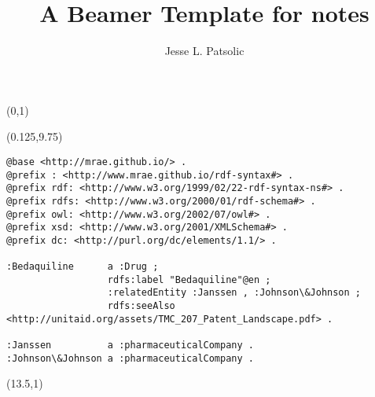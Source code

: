 \documentclass[xcolor=dvipsnames, aspectratio=169]{beamer}
\title[Daily Notes]{A Beamer Template for notes}
\subtitle[]{}
\author[JLP]{Jesse L. Patsolic}
\def\Title#1{\noindent{\large\textcolor{white}{\sf{#1}}}}
\newcommand\Mygrid{%
\tikz[
  remember picture,
  overlay,
  color=white,
  yscale=-1,
  xstep=\TPHorizModule,ystep=\TPVertModule,
  yshift=\TPVertModule,xshift=0pt]
  \draw (current page.north west) grid (current page.south east);}
\begin{document}
\begin{frame}[plain, fragile]

\begin{textblock}{5}(0,1)
\end{textblock}


\begin{textblock}{5}(0.125,9.75)
{\color{red}
\begin{lstlisting}[basicstyle=\tiny\ttfamily]
@base <http://mrae.github.io/> .
@prefix : <http://www.mrae.github.io/rdf-syntax#> .
@prefix rdf: <http://www.w3.org/1999/02/22-rdf-syntax-ns#> .
@prefix rdfs: <http://www.w3.org/2000/01/rdf-schema#> .
@prefix owl: <http://www.w3.org/2002/07/owl#> .
@prefix xsd: <http://www.w3.org/2001/XMLSchema#> .
@prefix dc: <http://purl.org/dc/elements/1.1/> .

:Bedaquiline      a :Drug ;
                  rdfs:label "Bedaquiline"@en ;
                  :relatedEntity :Janssen , :Johnson\&Johnson ;
                  rdfs:seeAlso <http://unitaid.org/assets/TMC_207_Patent_Landscape.pdf> .

:Janssen          a :pharmaceuticalCompany .
:Johnson\&Johnson a :pharmaceuticalCompany .
\end{lstlisting}
}
\end{textblock}

\begin{textblock}{3}(13.5,1)
	{\color{black!70}
	}
\end{textblock}


\end{frame}
\end{document}
